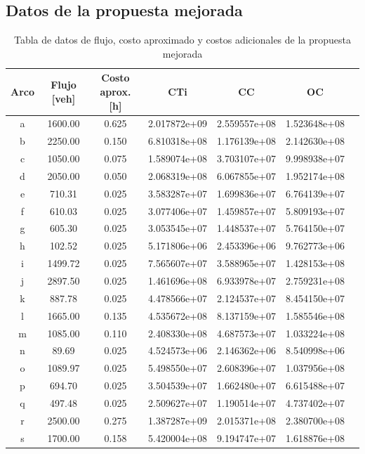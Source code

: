 \documentclass[letterpaper,12pt]{article}
\begin{document}
\newpage
\subsection{Datos de la propuesta mejorada}
\begin{table}[h!]
    \centering
    \begin{tabular}{ccccccc}
        \toprule
        \textbf{Arco} & \textbf{Flujo [veh]} & \textbf{Costo aprox. [h]} & \textbf{CTi} & \textbf{CC} & \textbf{OC} \\
        \midrule
        a & 1600.00 & 0.625 & 2.017872e+09 & 2.559557e+08 & 1.523648e+08 \\
        b & 2250.00 & 0.150 & 6.810318e+08 & 1.176139e+08 & 2.142630e+08 \\
        c & 1050.00 & 0.075 & 1.589074e+08 & 3.703107e+07 & 9.998938e+07 \\
        d & 2050.00 & 0.050 & 2.068319e+08 & 6.067855e+07 & 1.952174e+08 \\
        e & 710.31  & 0.025 & 3.583287e+07 & 1.699836e+07 & 6.764139e+07 \\
        f & 610.03  & 0.025 & 3.077406e+07 & 1.459857e+07 & 5.809193e+07 \\
        g & 605.30  & 0.025 & 3.053545e+07 & 1.448537e+07 & 5.764150e+07 \\
        h & 102.52  & 0.025 & 5.171806e+06 & 2.453396e+06 & 9.762773e+06 \\
        i & 1499.72 & 0.025 & 7.565607e+07 & 3.588965e+07 & 1.428153e+08 \\
        j & 2897.50 & 0.025 & 1.461696e+08 & 6.933978e+07 & 2.759231e+08 \\
        k & 887.78  & 0.025 & 4.478566e+07 & 2.124537e+07 & 8.454150e+07 \\
        l & 1665.00 & 0.135 & 4.535672e+08 & 8.137159e+07 & 1.585546e+08 \\
        m & 1085.00 & 0.110 & 2.408330e+08 & 4.687573e+07 & 1.033224e+08 \\
        n & 89.69   & 0.025 & 4.524573e+06 & 2.146362e+06 & 8.540998e+06 \\
        o & 1089.97 & 0.025 & 5.498550e+07 & 2.608396e+07 & 1.037956e+08 \\
        p & 694.70  & 0.025 & 3.504539e+07 & 1.662480e+07 & 6.615488e+07 \\
        q & 497.48  & 0.025 & 2.509627e+07 & 1.190514e+07 & 4.737402e+07 \\
        r & 2500.00 & 0.275 & 1.387287e+09 & 2.015371e+08 & 2.380700e+08 \\
        s & 1700.00 & 0.158 & 5.420004e+08 & 9.194747e+07 & 1.618876e+08 \\
        \bottomrule
    \end{tabular}
    \caption{Tabla de datos de flujo, costo aproximado y costos adicionales de la propuesta mejorada}
    \label{tab:datos}
\end{table}
\end{document}
